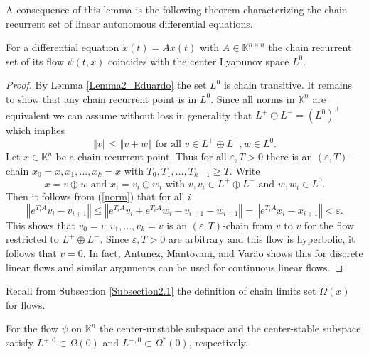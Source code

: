 \documentclass{siamltex}%
\begin{document}
A consequence of this lemma is the following theorem characterizing the chain
recurrent set of linear autonomous differential equations.

\begin{theorem}
\label{Theorem_1_Eduardo}For a differential equation $\dot{x}(t)=Ax(t)$ with
$A\in\mathbb{K}^{n\times n}$ the chain recurrent set of its flow $\psi(t,x)$
coincides with the center Lyapunov space $L^{0}$.
\end{theorem}

\begin{proof}
By Lemma \ref{Lemma2_Eduardo} the set $L^{0}$ is chain transitive. It remains
to show that any chain recurrent point is in $L^{0}$. Since all norms in
$\mathbb{K}^{n}$ are equivalent we can assume without loss in generality that
$L^{+}\oplus L^{-}=\left(  L^{0}\right)  ^{\bot}$ which implies%
\begin{equation}
\left\Vert v\right\Vert \leq\left\Vert v+w\right\Vert \text{ for all }v\in
L^{+}\oplus L^{-},w\in L^{0}. \label{norm}%
\end{equation}
Let $x\in\mathbb{K}^{n}$ be a chain recurrent point. Thus for all
$\varepsilon,T>0$ there is an $(\varepsilon,T)$-chain $x_{0}=x,x_{1}%
,\ldots,x_{k}=x$ with $T_{0},T_{1},\ldots,T_{k-1}\geq T$. Write%
\[
x=v\oplus w\text{ and }x_{i}=v_{i}\oplus w_{i}\text{ with }v,v_{i}\in
L^{+}\oplus L^{-}\text{ and }w,w_{i}\in L^{0}.
\]
Then it follows from (\ref{norm}) that for all $i$%
\[
\left\Vert e^{T_{i}A}v_{i}-v_{i+1}\right\Vert \leq\left\Vert e^{T_{i}A}%
v_{i}+e^{T_{i}A}w_{i}-v_{i+1}-w_{i+1}\right\Vert =\left\Vert e^{T_{i}A}%
x_{i}-x_{i+1}\right\Vert <\varepsilon.
\]
This shows that $v_{0}=v,v_{1},\ldots,v_{k}=v$ is an $(\varepsilon,T)$-chain
from $v$ to $v$ for the flow restricted to $L^{+}\oplus L^{-}$. Since
$\varepsilon,T>0$ are arbitrary and this flow is hyperbolic, it follows that
$v=0$. In fact, Antunez, Mantovani, and Var\~{a}o \cite[Corollary
2.11]{AntMV22} shows this for discrete linear flows and similar arguments can
be used for continuous linear flows.
\end{proof}

Recall from Subsection \ref{Subsection2.1} the definition of chain limits set
$\Omega(x)$ for flows.

\begin{proposition}
\label{Proposition_A}For the flow $\psi$ on $\mathbb{K}^{n}$ the
center-unstable subspace and the center-stable subspace satisfy $L^{+,0}%
\subset\Omega(0)$ and $L^{-,0}\subset\Omega^{\ast}(0)$, respectively.
\end{proposition}
\end{document}

